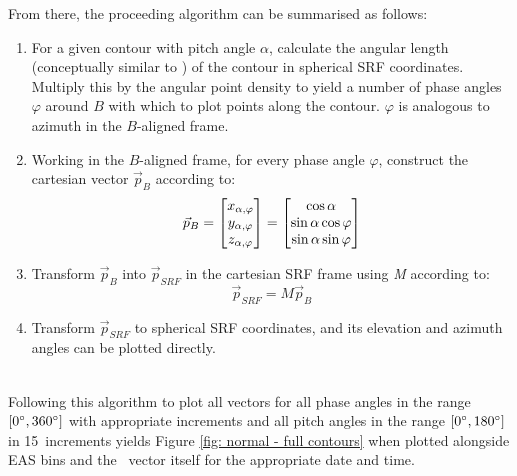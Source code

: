 From there, the proceeding algorithm can be summarised as follows:
\begin{enumerate}
    \item For a given contour with pitch angle \(\alpha\), calculate the angular length (conceptually similar to ) of the contour in spherical SRF coordinates. Multiply this by the angular point density to yield a number of phase angles \(\varphi\) around \(B\) with which to plot points along the contour. \(\varphi\) is analogous to azimuth in the \(B\)-aligned frame.
    \item Working in the \(B\)-aligned frame, for every phase angle \(\varphi\), construct the cartesian vector \(\vec{p}_B\) according to:
    \begin{equation} \label{eq: contour vector construction}
        \centerfloat
        \vec{p}_B=
        \begin{bmatrix}
        x_{\alpha,\varphi}\\
        y_{\alpha,\varphi}\\
        z_{\alpha,\varphi}\\
        \end{bmatrix}
        =
        \begin{bmatrix}
        \cos{\alpha}\\
        \sin{\alpha}\cos{\varphi}\\
        \sin{\alpha}\sin{\varphi}\\
        \end{bmatrix}
    \end{equation}
    \item Transform \(\vec{p}_B\) into \(\vec{p}_{SRF}\) in the cartesian SRF frame using \textit{M} according to:
    \begin{equation} \label{eq: contour vector transform}
        \vec{p}_{SRF}=M\vec{p}_B
    \end{equation}
    \item Transform \(\vec{p}_{SRF}\) to spherical SRF coordinates, and its elevation and azimuth angles can be plotted directly.
\end{enumerate}
\\

Following this algorithm to plot all vectors for all phase angles in the range \([0\degree,360\degree]\) with appropriate increments and all pitch angles in the range \([0\degree,180\degree]\) in 15\degree\ increments yields Figure \ref{fig: normal - full contours} when plotted alongside EAS bins and the \Beas\ vector itself for the appropriate date and time.
\\

